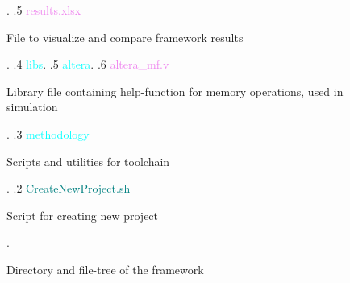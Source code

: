\begin{figure}
\begin{minipage}{0.99\textwidth}
{\begin{minipage}[t]{5.4cm}
                                                            \end{minipage}. 
    .5 \textcolor{violet}{results{.}xlsx} \dotfill \:\:\begin{minipage}[t]{5.4cm}
                                                            File to visualize and compare framework results
                                                            \end{minipage}. 
    .4 \textcolor{cyan}{libs}.
    .5 \textcolor{cyan}{altera}.
    .6 \textcolor{violet}{altera\_mf{.}v} \dotfill \:\:\begin{minipage}[t]{5.4cm}
                                                            Library file containing help-function for memory operations, used in simulation
                                                            \end{minipage}. 
    .3 \textcolor{cyan}{methodology} \dotfill \:\:\begin{minipage}[t]{5.4cm}
                                                            Scripts and utilities for toolchain
                                                            \end{minipage}. 
    .2 \textcolor{teal}{CreateNewProject{.}sh} \dotfill \:\:\begin{minipage}[t]{5.4cm}
                                                            Script for creating new project
                                                            \end{minipage}. 
    }
\end{minipage}
\caption{Directory and file-tree of the framework}
\label{fig:frameworkdirtree}
\end{figure}

